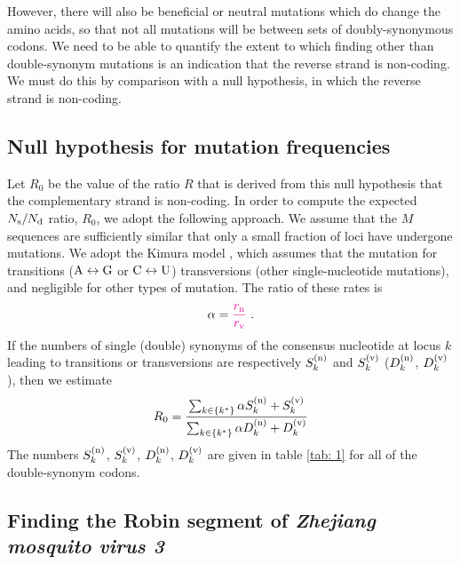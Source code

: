 \documentclass[unnumsec,webpdf,contemporary,large,namedate]{oup-authoring-template}%
\theoremstyle{thmstyleone}%
\theoremstyle{thmstyletwo}%
\theoremstyle{thmstylethree}%
\begin{document}
However, there will also be beneficial
or neutral mutations which do change the amino acids, so that not all mutations
will be between sets of doubly-synonymous codons. We need to be able to
quantify the extent to which finding other than double-synonym mutations is
an indication that the reverse strand is non-coding. We must do this by comparison with
a null hypothesis, in which the reverse strand is non-coding.

\subsection{Null hypothesis for mutation frequencies}
\label{sec: 4.3}

Let $R_0$ be the value of the ratio $R$ that is derived from this null hypothesis that
the complementary strand is non-coding.
In order to compute the expected $N_{\rm s}/N_{\rm d}$ ratio, $R_0$, we adopt the following
approach. We assume that the $M$ sequences are sufficiently similar
that only a small fraction of loci have undergone mutations.
We adopt the Kimura model \citep{Kim80}, which assumes that the mutation
 for transitions (${\rm A}\leftrightarrow {\rm G}$ or ${\rm C}\leftrightarrow{\rm U}$) 
 transversions (other single-nucleotide mutations), and negligible for
other types of mutation. The ratio of these rates is
%
\begin{equation}
\label{eq: 6.6}
\alpha={\color{magenta}{\frac{r_{\rm n}}{r_{\rm v}}}}
\ .
\end{equation}
%
If the numbers of single (double) synonyms of the consensus nucleotide at locus $k$ leading to
transitions or transversions are respectively $S^{({\rm n})}_k$ and $S^{({\rm v})}_k$
($D^{({\rm n})}_k$, $D^{({\rm v})}_k$), then we estimate
%
\begin{equation}
\label{eq: 4.7}
R_0=
\frac{\sum_{k\in\{k^\ast\}}\alpha S_k^{({\rm n})}+S^{({\rm v})}_k}
{\sum_{k\in\{k^\ast\}}\alpha D^{({\rm n})}_k+D_k^{({\rm v})}}
\end{equation}
%
The numbers $S^{({\rm n})}_k$, $S^{({\rm v})}_k$, $D^{({\rm n})}_k$, $D^{({\rm v})}_k$ are given
in table \ref{tab: 1} for all of the double-synonym codons.

\subsection{Finding the Robin segment of \emph{Zhejiang mosquito virus 3}}
\label{sec: 4.4}
\end{document}
